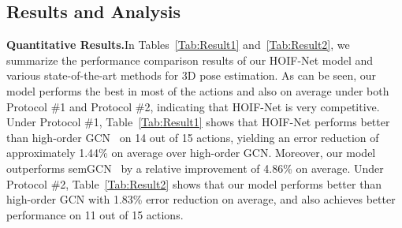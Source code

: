 \documentclass{bmvc2k}
\begin{document}
\subsection{Results and Analysis}
\noindent\textbf{Quantitative Results.}\quad In Tables~\ref{Tab:Result1} and~\ref{Tab:Result2}, we summarize the performance comparison results of our HOIF-Net model and various state-of-the-art methods for 3D pose estimation. As can be seen, our model performs the best in most of the actions and also on average under both Protocol \#1 and Protocol \#2, indicating that HOIF-Net is very competitive. Under Protocol \#1, Table~\ref{Tab:Result1} shows that HOIF-Net performs better than high-order GCN~\cite{zou2020high} on 14 out of 15 actions, yielding an error reduction of approximately 1.44\% on average over high-order GCN. Moreover, our model outperforms semGCN~\cite{zhao2019semantic} by a relative improvement of 4.86\% on average. Under Protocol \#2, Table~\ref{Tab:Result2} shows that our model performs better than high-order GCN with 1.83\% error reduction on average, and also achieves better performance on 11 out of 15 actions.
\end{document}
